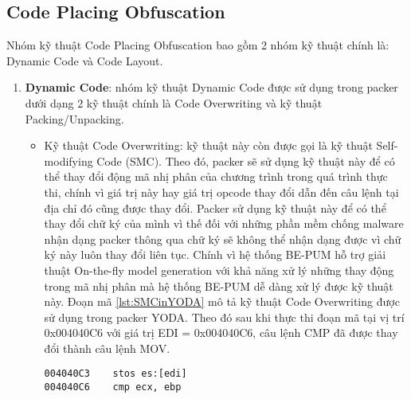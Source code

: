 \subsection{Code Placing Obfuscation}\label{subsec:Packer1Tech}
\hspace{0.5cm}Nhóm kỹ thuật Code Placing Obfuscation bao gồm 2 nhóm kỹ thuật chính là: Dynamic Code và Code Layout.
\begin{enumerate}
\item{\textbf{Dynamic Code}: nhóm kỹ thuật Dynamic Code được sử dụng trong packer dưới dạng 2 kỹ thuật chính là Code Overwriting và kỹ thuật Packing/Unpacking.  
\begin{itemize}
\item{Kỹ thuật Code Overwriting: kỹ thuật này còn được gọi là kỹ thuật Self-modifying Code (SMC). Theo đó, packer sẽ sử dụng kỹ thuật này để có thể thay đổi động mã nhị phân của chương trình trong quá trình thực thi, chính vì giá trị này hay giá trị opcode thay đổi dẫn đến câu lệnh tại địa chỉ đó cũng được thay đổi. Packer sử dụng kỹ thuật này để có thể thay đổi chữ ký của mình vì thế đối với những phần mềm chống malware nhận dạng packer thông qua chữ ký sẽ không thể nhận dạng được vì chữ ký này luôn thay đổi liên tục. Chính vì hệ thống BE-PUM hỗ trợ giải thuật On-the-fly model generation với khả năng xử lý những thay động trong mã nhị phân mà hệ thống BE-PUM dễ dàng xử lý được kỹ thuật này. Đoạn mã \ref {lst:SMCinYODA} mô tả kỹ thuật Code Overwriting được sử dụng trong packer YODA. Theo đó sau khi thực thi đoạn mã tại vị trí 0x004040C6 với giá trị EDI = 0x004040C6, câu lệnh CMP đã được thay đổi thành câu lệnh MOV. 
\begin{code}
\begin{lstlisting}[captionpos=b,caption={Kỹ thuật Code Overwriting sử dụng trong packer YODA},label={lst:SMCinYODA},frame=single]
004040C3	stos es:[edi]
004040C6	cmp ecx, ebp


\end{lstlisting}
\end{code}}
\end{itemize}}
\end{enumerate}
